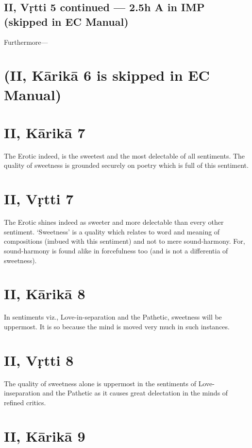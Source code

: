 \documentclass[12pt]{book}
\begin{document}
\subsection{II, Vṛtti 5 continued --- 2.5h A in IMP (skipped in EC Manual)}

Furthermore---


\section{(II, Kārikā 6 is skipped in EC Manual)}


\section{II, Kārikā 7}

The Erotic indeed, is the sweetest and the most delectable
of all sentiments. The quality of sweetness is grounded
securely on poetry which is full of this sentiment.


\section{II, Vṛtti 7}

The Erotic shines indeed as sweeter and more delectable
than every other sentiment. `Sweetness' is a quality which
relates to word and meaning of compositions (imbued with this
sentiment) and not to mere sound-harmony. For, sound-harmony is found alike in forcefulness too (and is not a differentia
of sweetness).


\section{II, Kārikā 8}

In sentiments viz., Love-in-separation and the Pathetic,
sweetness will be uppermost. It is so because the mind is
moved very much in such instances.


\section{II, Vṛtti 8}

The quality of sweetness alone is uppermost in the sentiments
of Love-in\-separation and the Pathetic as it causes great
delectation in the minds of refined critics.


\section{II, Kārikā 9}
\end{document}
